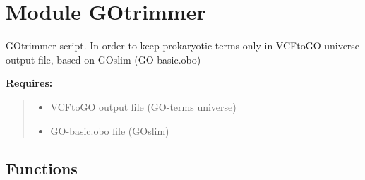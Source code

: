 %
%
%


\section{Module GOtrimmer}

    \label{GOtrimmer}
GOtrimmer script. In order to keep prokaryotic terms only in VCFtoGO 
universe output file, based on GOslim (GO-basic.obo)

\textbf{Requires:}
\begin{quote}
  \begin{itemize}

  \item
    \setlength{\parskip}{0.6ex}
VCFtoGO output file (GO-terms universe)



  \item GO-basic.obo file (GOslim)



\end{itemize}

\end{quote}



  \subsection{Functions}

    \label{GOtrimmer:get_parser}

    \vspace{0.5ex}

